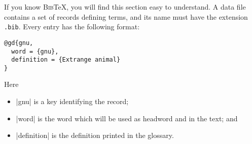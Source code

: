 \documentclass{ltxguide}
\newcommand{\bibTeX}{\textsc{Bib}\TeX}
\begin{document}
If you know \bibTeX, you will find this section easy to understand.
A data file contains a set of records defining terms, and its
name must have the extension \texttt{.bib}. Every entry has the
following format:
\begin{verbatim}
@gd{gnu,
  word = {gnu},
  definition = {Extrange animal}
}
\end{verbatim}

Here
\begin{itemize}
\item |gnu| is a key identifying the record;
\item |word| is the word which will be used as headword and in the 
  text; and
\item |definition| is the definition printed in the glossary.
\end{itemize}
\end{document}
